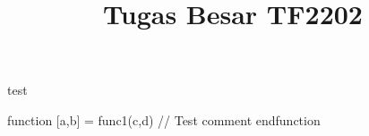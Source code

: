 \documentclass[12pt]{article}
\begin{document}
\title{Tugas Besar TF2202}
\date{}
\maketitle

test

\begin{scilabcode}
function [a,b] = func1(c,d)
  // Test comment
endfunction
\end{scilabcode}








\end{document}
